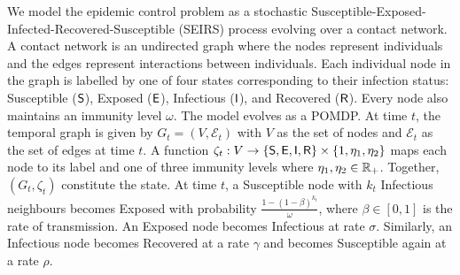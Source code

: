 We model the epidemic control problem as a stochastic Susceptible-Exposed-Infected-Recovered-Susceptible (SEIRS) process evolving over a contact network.
A contact network is an undirected graph where the nodes represent individuals and the edges represent interactions between individuals. Each individual node in the graph is labelled by one of four states corresponding to their infection status: Susceptible ($\mathsf{S}$), Exposed ($\mathsf{E}$), Infectious ($\mathsf{I}$), and Recovered ($\mathsf{R}$). Every node also maintains an immunity level $\omega$. The model evolves as a POMDP. At time $t$, the temporal graph is given by $G_t = (V, \mathcal{E}_t)$ with $V$ as the set of nodes and $\mathcal{E}_t$ as the set of edges at time $t$. A function $\zeta_t : V \to \{\mathsf{S}, \mathsf{E}, \mathsf{I}, \mathsf{R}\} \times \{1, \eta_1, \eta_2\}$ maps each node to its label and one of three immunity levels where $\eta_1, \eta_2 \in  \mathbb{R}_+$. Together, $(G_t, \zeta_t)$ constitute the state. 
At time $t$, a Susceptible node with $k_t$ Infectious neighbours becomes Exposed with probability $\frac{1-(1-\beta)^{k_t}}{\omega}$, where $\beta \in [0, 1]$ is the rate of transmission. An Exposed node becomes Infectious at rate $\sigma$. Similarly, an Infectious node becomes Recovered at a rate $\gamma$ and becomes Susceptible again at a rate $\rho$.

